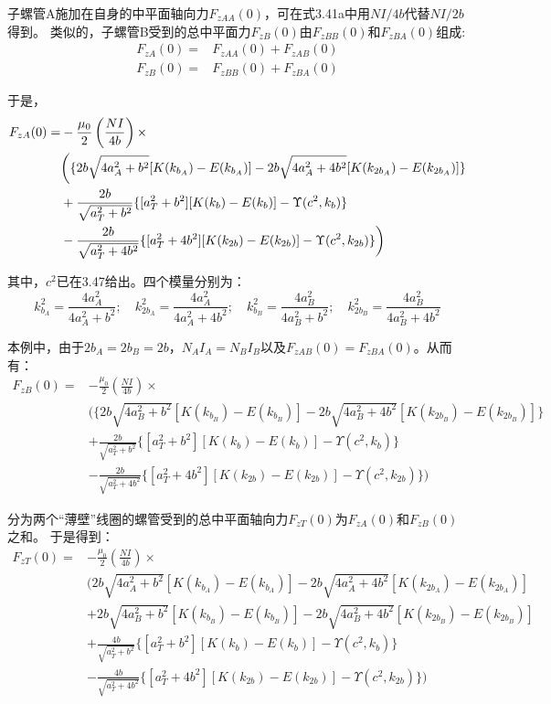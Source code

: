 子螺管A施加在自身的中平面轴向力$F_{zAA}(0)$，可在式3.41a中用$NI/4b$代替$NI/2b$得到。
类似的，子螺管B受到的总中平面力$F_{zB}(0)$由$F_{zBB}(0)$和$F_{zBA}(0)$组成:
\begin{subequations}
	\begin{align}
F_{zA}(0) =& F_{zAA}(0)+F_{zAB}(0) \\
F_{zB}(0) =& F_{zBB}(0)+F_{zBA}(0)
	\end{align}
\end{subequations}

于是，
\begin{align}
F_{zA}(0)=&-\frac{\mu_0}{2}\left(\frac{N I}{4b}\right)\times \\\notag
&\bigg( \{2b\sqrt{4a_A^2+b^2}[K(k_{b_A})-E(k_{b_A})]-2b\sqrt{4a_A^2+4b^2}[K(k_{2b_A})-E(k_{2b_A})]\}\\\notag
&+\frac{2b}{\sqrt{a_T^2+b^2}} \{[a_T^2+b^2][K(k_{b})-E(k_{b})]-\Upsilon(c^2,k_b)\}\\\notag
&-\frac{2b}{\sqrt{a_T^2+4b^2}} \{[a_T^2+4b^2][K(k_{2b})-E(k_{2b})]-\Upsilon(c^2,k_{2b}) \}\bigg)
\end{align}

其中，$c^2$已在3.47给出。四个模量分别为：
$$k_{b_A}^2=\frac{4a_A^2}{4a_A^2+b^2} ;\quad k_{2b_A}^2=\frac{4a^2_A}{4a_A^2+4b^2};\quad
k_{b_B}^2=\frac{4a_B^2}{4a_B^2+b^2} ;\quad k_{2b_B}^2=\frac{4a^2_B}{4a_B^2+4b^2} $$

本例中，由于$2b_A=2b_B=2b$，$N_A I_A=N_B I_B$以及$F_{zAB}(0)=F_{zBA}(0)$。从而有：
\begin{equation*}
\begin{split}
F_{zB}(0)=&-\frac{\mu_0}{2}\left(\frac{N I}{4b}\right)\times \\
&\bigg( \{2b\sqrt{4a_B^2+b^2}[K(k_{b_B})-E(k_{b_B})]-2b\sqrt{4a_B^2+4b^2}[K(k_{2b_B})-E(k_{2b_B})]\}\\
&+\frac{2b}{\sqrt{a_T^2+b^2}} \{[a_T^2+b^2][K(k_{b})-E(k_{b})]-\Upsilon(c^2,k_b)\}\\
&-\frac{2b}{\sqrt{a_T^2+4b^2}} \{[a_T^2+4b^2][K(k_{2b})-E(k_{2b})]-\Upsilon(c^2,k_{2b}) \}\bigg)
\end{split}\tag{3.53b}
\end{equation*}

分为两个``薄壁''线圈的螺管受到的总中平面轴向力$F_{zT}(0)$为$F_{zA}(0)$和$F_{zB}(0)$之和。
于是得到：
\begin{equation}
\begin{split}
F_{zT}(0)=&-\frac{\mu_0}{2}\left(\frac{N I}{4b}\right)\times \\
&\bigg(2b\sqrt{4a_A^2+b^2}[K(k_{b_A})-E(k_{b_A})]-2b\sqrt{4a_A^2+4b^2}[K(k_{2b_A})-E(k_{2b_A})]\\
&+2b\sqrt{4a_B^2+b^2}[K(k_{b_B})-E(k_{b_B})]-2b\sqrt{4a_B^2+4b^2}[K(k_{2b_B})-E(k_{2b_B})]\\
&+\frac{4b}{\sqrt{a_T^2+b^2}} \{[a_T^2+b^2][K(k_{b})-E(k_{b})]-\Upsilon(c^2,k_b)\}\\
&-\frac{4b}{\sqrt{a_T^2+4b^2}} \{[a_T^2+4b^2][K(k_{2b})-E(k_{2b})]-\Upsilon(c^2,k_{2b}) \}\bigg)
\end{split}
\end{equation}

